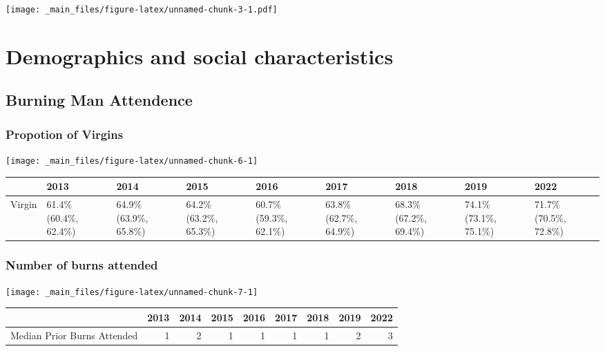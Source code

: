 \documentclass[
]{book}
\begin{document}
\texttt{[image: \_main\_files/figure-latex/unnamed-chunk-3-1.pdf]}

\hypertarget{sociodemo}{%
\chapter{Demographics and social characteristics}\label{sociodemo}}

\hypertarget{burning-man-attendence}{%
\section{Burning Man Attendence}\label{burning-man-attendence}}

\hypertarget{propotion-of-virgins}{%
\subsection{Propotion of Virgins}\label{propotion-of-virgins}}

\texttt{[image: \_main\_files/figure-latex/unnamed-chunk-6-1]}

\begin{table}
\centering
\begin{tabular}[t]{>{}l|>{}l|>{}l|>{}l|>{}l|>{}l|>{}l|>{}l|>{}l}
\hline
  & 2013 & 2014 & 2015 & 2016 & 2017 & 2018 & 2019 & 2022\\
\hline
Virgin & 61.4\% (60.4\%, 62.4\%) & 64.9\% (63.9\%, 65.8\%) & 64.2\% (63.2\%, 65.3\%) & 60.7\% (59.3\%, 62.1\%) & 63.8\% (62.7\%, 64.9\%) & 68.3\% (67.2\%, 69.4\%) & 74.1\% (73.1\%, 75.1\%) & 71.7\% (70.5\%, 72.8\%)\\
\hline
\end{tabular}
\end{table}

\hypertarget{number-of-burns-attended}{%
\subsection{Number of burns attended}\label{number-of-burns-attended}}

\texttt{[image: \_main\_files/figure-latex/unnamed-chunk-7-1]}

\begin{table}
\centering
\begin{tabular}[t]{>{}l|>{}r|>{}r|>{}r|>{}r|>{}r|>{}r|>{}r|>{}r}
\hline
  & 2013 & 2014 & 2015 & 2016 & 2017 & 2018 & 2019 & 2022\\
\hline
Median Prior Burns Attended & 1 & 2 & 1 & 1 & 1 & 1 & 2 & 3\\
\hline
\end{tabular}
\end{table}
\end{document}
